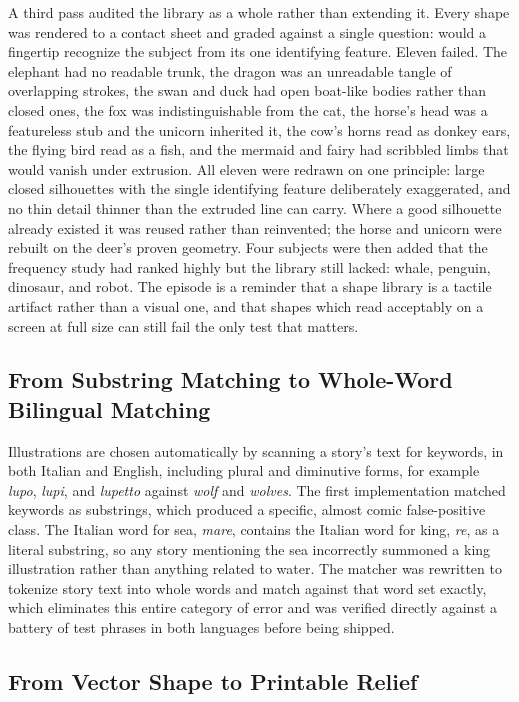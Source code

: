\documentclass[conference]{IEEEtran}
\begin{document}
A third pass audited the library as a whole rather than extending it. Every shape was rendered to a contact sheet and graded against a single question: would a fingertip recognize the subject from its one identifying feature. Eleven failed. The elephant had no readable trunk, the dragon was an unreadable tangle of overlapping strokes, the swan and duck had open boat-like bodies rather than closed ones, the fox was indistinguishable from the cat, the horse's head was a featureless stub and the unicorn inherited it, the cow's horns read as donkey ears, the flying bird read as a fish, and the mermaid and fairy had scribbled limbs that would vanish under extrusion. All eleven were redrawn on one principle: large closed silhouettes with the single identifying feature deliberately exaggerated, and no thin detail thinner than the extruded line can carry. Where a good silhouette already existed it was reused rather than reinvented; the horse and unicorn were rebuilt on the deer's proven geometry. Four subjects were then added that the frequency study had ranked highly but the library still lacked: whale, penguin, dinosaur, and robot. The episode is a reminder that a shape library is a tactile artifact rather than a visual one, and that shapes which read acceptably on a screen at full size can still fail the only test that matters.

\subsection{From Substring Matching to Whole-Word Bilingual Matching}

Illustrations are chosen automatically by scanning a story's text for keywords, in both Italian and English, including plural and diminutive forms, for example \emph{lupo}, \emph{lupi}, and \emph{lupetto} against \emph{wolf} and \emph{wolves}. The first implementation matched keywords as substrings, which produced a specific, almost comic false-positive class. The Italian word for sea, \emph{mare}, contains the Italian word for king, \emph{re}, as a literal substring, so any story mentioning the sea incorrectly summoned a king illustration rather than anything related to water. The matcher was rewritten to tokenize story text into whole words and match against that word set exactly, which eliminates this entire category of error and was verified directly against a battery of test phrases in both languages before being shipped.

\subsection{From Vector Shape to Printable Relief}
\end{document}
